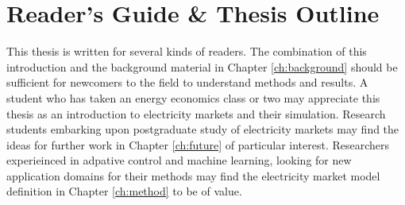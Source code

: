 
%

\section{Reader's Guide \& Thesis Outline}
This thesis is written for several kinds of readers.  The combination of this
introduction and the background material in Chapter \ref{ch:background} should
be sufficient for newcomers to the field to understand methods and results.  A
student who has taken an energy economics class or two may appreciate this
thesis as an introduction to electricity markets and their simulation.
Research students embarking upon postgraduate study of electricity markets may
find the ideas for further work in Chapter \ref{ch:future} of particular
interest.  Researchers experieinced in adpative control and machine learning,
looking for new application domains for their methods may find the electricity
market model definition in Chapter \ref{ch:method} to be of value.

